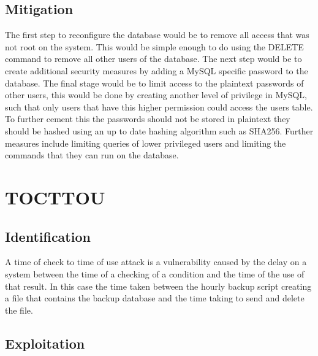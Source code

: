 \documentclass[paper=a4, fontsize=11pt]{scrartcl}
\numberwithin{equation}{section}		%
\numberwithin{figure}{section}			%
\numberwithin{table}{section}				%
\begin{document}
\subsection*{Mitigation}


The first step to reconfigure the database would be to remove all access that was not root on the system. This would be simple enough to do using the DELETE command to remove all other users of the database. The next step would be to create additional security measures by adding a MySQL specific password to the database. The final stage would be to limit access to the plaintext passwords of other users, this would be done by creating another level of privilege in MySQL, such that only users that have this higher permission could access the users table. To further cement this the passwords should not be stored in plaintext they should be hashed using an up to date hashing algorithm such as SHA256. Further measures include limiting queries of lower privileged users and limiting the commands that they can run on the database.

\section*{TOCTTOU}
\subsection*{Identification}


A time of check to time of use attack is a vulnerability caused by the delay on a system between the time of a checking of a condition and the time of the use of that result. In this case the time taken between the hourly backup script creating a file that contains the backup database and the time taking to send and delete the file. 

\subsection*{Exploitation}
\end{document}
